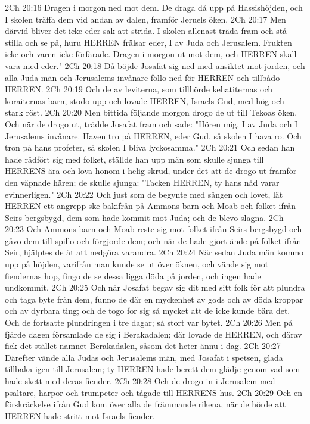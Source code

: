 2Ch 20:16  Dragen i morgon ned mot dem. De draga då upp på Hassishöjden, och I skolen träffa dem vid andan av dalen, framför Jeruels öken.
2Ch 20:17  Men därvid bliver det icke eder sak att strida. I skolen allenast träda fram och stå stilla och se på, huru HERREN frälsar eder, I av Juda och Jerusalem. Frukten icke och varen icke förfärade. Dragen i morgon ut mot dem, och HERREN skall vara med eder."
2Ch 20:18  Då böjde Josafat sig ned med ansiktet mot jorden, och alla Juda män och Jerusalems invånare föllo ned för HERREN och tillbådo HERREN.
2Ch 20:19  Och de av leviterna, som tillhörde kehatiternas och koraiternas barn, stodo upp och lovade HERREN, Israels Gud, med hög och stark röst.
2Ch 20:20  Men bittida följande morgon drogo de ut till Tekoas öken. Och när de drogo ut, trädde Josafat fram och sade: "Hören mig, I av Juda och I Jerusalems invånare. Haven tro på HERREN, eder Gud, så skolen I hava ro. Och tron på hans profeter, så skolen I bliva lyckosamma."
2Ch 20:21  Och sedan han hade rådfört sig med folket, ställde han upp män som skulle sjunga till HERRENS ära och lova honom i helig skrud, under det att de drogo ut framför den väpnade hären; de skulle sjunga: "Tacken HERREN, ty hans nåd varar evinnerligen."
2Ch 20:22  Och just som de begynte med sången och lovet, lät HERREN ett angrepp ske bakifrån på Ammons barn och Moab och folket ifrån Seirs bergsbygd, dem som hade kommit mot Juda; och de blevo slagna.
2Ch 20:23  Och Ammons barn och Moab reste sig mot folket ifrån Seirs bergsbygd och gåvo dem till spillo och förgjorde dem; och när de hade gjort ände på folket ifrån Seir, hjälptes de åt att nedgöra varandra.
2Ch 20:24  När sedan Juda män kommo upp på höjden, varifrån man kunde se ut över öknen, och vände sig mot fiendernas hop, fingo de se dessa ligga döda på jorden, och ingen hade undkommit.
2Ch 20:25  Och när Josafat begav sig dit med sitt folk för att plundra och taga byte från dem, funno de där en myckenhet av gods och av döda kroppar och av dyrbara ting; och de togo for sig så mycket att de icke kunde bära det. Och de fortsatte plundringen i tre dagar; så stort var bytet.
2Ch 20:26  Men på fjärde dagen församlade de sig i Berakadalen; där lovade de HERREN, och därav fick det stället namnet Berakadalen, såsom det heter ännu i dag.
2Ch 20:27  Därefter vände alla Judas och Jerusalems män, med Josafat i spetsen, glada tillbaka igen till Jerusalem; ty HERREN hade berett dem glädje genom vad som hade skett med deras fiender.
2Ch 20:28  Och de drogo in i Jerusalem med psaltare, harpor och trumpeter och tågade till HERRENS hus.
2Ch 20:29  Och en förskräckelse ifrån Gud kom över alla de främmande rikena, när de hörde att HERREN hade stritt mot Israels fiender.
